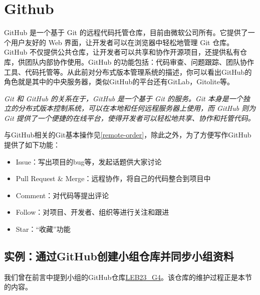 \section{Github}
GitHub 是一个基于 Git 的远程代码托管仓库，目前由微软公司所有。它提供了一个用户友好的 Web 界面，让开发者可以在浏览器中轻松地管理 Git 仓库。GitHub 不仅提供公共仓库，让开发者可以共享和协作开源项目，还提供私有仓库，供团队内部协作使用。GitHub 的功能包括：代码审查、问题跟踪、团队协作工具、代码托管等。从此前对分布式版本管理系统的描述，你可以看出GitHub的角色就是其中的中央服务器，类似GitHub的平台还有GitLab，Gitolite等。

\begin{remark}
    \textit{Git 和 GitHub 的关系在于，GitHub 是一个基于 Git 的服务。Git 本身是一个独立的分布式版本控制系统，可以在本地和任何远程服务器上使用，而 GitHub 则为 Git 提供了一个便捷的在线平台，使得开发者可以轻松地共享、协作和托管代码。}
\end{remark}

与GitHub相关的Git基本操作见\ref{remote-order}，除此之外，为了方便写作GitHub提供了如下功能：
\begin{itemize}
    \item Issue：写出项目的bug等，发起话题供大家讨论
    \item Pull Request \& Merge：远程协作，将自己的代码整合到项目中
    \item Comment：对代码等提出评论
    \item Follow：对项目、开发者、组织等进行关注和跟进
    \item Star：“收藏”功能
\end{itemize}


\subsection{实例：通过GitHub创建小组仓库并同步小组资料}

我们曾在前言中提到小组的GitHub仓库\href{https://github.com/Alchemiiiist/LEB23\_G4}{LEB23\_G4}。该仓库的维护过程正是本节的内容。

